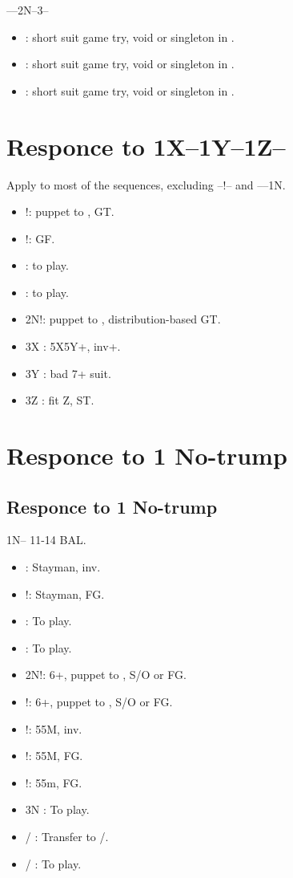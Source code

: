 \documentclass[12pt,twoside,a5paper]{report}%
\begin{document}
	----2N--3\cl{}--
	\begin{itemize}
	\renewcommand{\labelitemi}{}
	\item {} : short suit game try, void or singleton in \di{}.
	\item {} : short suit game try, void or singleton in \he{}.
	\item {} : short suit game try, void or singleton in \cl{}.
	\end{itemize}

\chapter*{Responce to 1X--1Y--1Z--}
	Apply to most of the sequences, excluding --!-- and ----1N.
	\begin{itemize}
	\renewcommand{\labelitemi}{}
		\item {}!: puppet to , GT.
		\item {}!: GF.
		\item {} : to play.
		\item {} : to play.
		\item 2N!: puppet to , distribution-based GT.
		\item 3X : 5X5Y+, inv+.
		\item 3Y : bad 7+ suit.
		\item 3Z : fit Z, ST.
	\end{itemize}
\chapter*{Responce to 1 No-trump}

	\section*{Responce to 1 No-trump}
		1N-- 11-14 BAL.
		\begin{itemize}
		\renewcommand{\labelitemi}{}
		\item {} : Stayman, inv.
		\item {}!: Stayman, FG.
		\item {} : To play.
		\item {} : To play.
		\item 2N!: 6+\cl{}, puppet to , S/O or FG.
		\item {}!: 6+\di{}, puppet to , S/O or FG.
		\item {}!: 55M, inv.
		\item {}!: 55M, FG.
		\item {}!: 55m, FG.
		\item 3N : To play.
		\item {}/ : Transfer to /\sp{}.
		\item {}/ : To play.
		\end{itemize}
\end{document}

